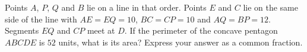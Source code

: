 Points $A$, $P$, $Q$ and $B$ lie on a line in that order. Points $E$ and $C$ lie on the same side of the line with $AE=EQ=10$, $BC=CP=10$ and $AQ=BP=12$. Segments $EQ$ and $CP$ meet at $D$. If the perimeter of the concave pentagon $ABCDE$ is $52$ units, what is its area? Express your answer as a common fraction.
